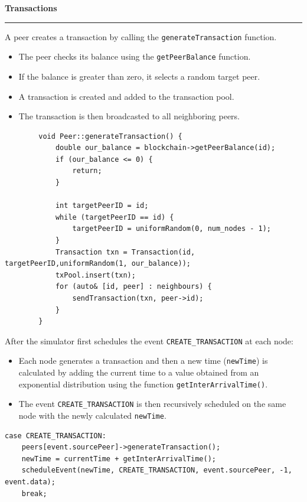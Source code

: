 \documentclass[a4paper,12pt]{article}
\newenvironment{solution}[2][]{%
\begin{mdframed}[linecolor=blue!70!black, linewidth=2pt, roundcorner=10pt, backgroundcolor=yellow!10!white, skipabove=12pt, skipbelow=12pt]%
	\textbf{\large #2}
	\par\noindent\rule{\textwidth}{0.4pt}
}{
\end{mdframed}
}
\begin{document}
\begin{solution}{Transactions}
	A peer creates a transaction by calling the \texttt{generateTransaction} function.
	\begin{itemize}
		\item The peer checks its balance using the \texttt{getPeerBalance} function.
		\item If the balance is greater than zero, it selects a random target peer.
		\item A transaction is created and added to the transaction pool.
		\item The transaction is then broadcasted to all neighboring peers.
	\end{itemize}

\begin{mdframed}[linecolor=black, linewidth=2pt, roundcorner=10pt, backgroundcolor=yellow!10!white, skipabove=12pt, skipbelow=12pt]
	\begin{verbatim}
		void Peer::generateTransaction() {
			double our_balance = blockchain->getPeerBalance(id);
			if (our_balance <= 0) {
				return;
			}
			
			int targetPeerID = id;
			while (targetPeerID == id) {
				targetPeerID = uniformRandom(0, num_nodes - 1);
			}
			Transaction txn = Transaction(id, targetPeerID,uniformRandom(1, our_balance));
			txPool.insert(txn);
			for (auto& [id, peer] : neighbours) {
				sendTransaction(txn, peer->id);
			}
		}
	\end{verbatim}
\end{mdframed}

After the simulator first schedules the event \texttt{CREATE\_TRANSACTION} at each node:
    \begin{itemize}
        \item Each node generates a transaction and then a new time (\texttt{newTime}) is calculated by adding the current time to a value obtained from an exponential distribution using the function \texttt{getInterArrivalTime()}.
        \item The event \texttt{CREATE\_TRANSACTION} is then recursively scheduled on the same node with the newly calculated \texttt{newTime}.
    \end{itemize}

\begin{mdframed}[linecolor=black, linewidth=2pt, roundcorner=10pt, backgroundcolor=yellow!10!white, skipabove=12pt, skipbelow=12pt]
\begin{verbatim}
case CREATE_TRANSACTION:
	peers[event.sourcePeer]->generateTransaction();
	newTime = currentTime + getInterArrivalTime();
	scheduleEvent(newTime, CREATE_TRANSACTION, event.sourcePeer, -1, event.data);
	break;
	\end{verbatim}
\end{mdframed}
	
\end{solution}
\end{document}
